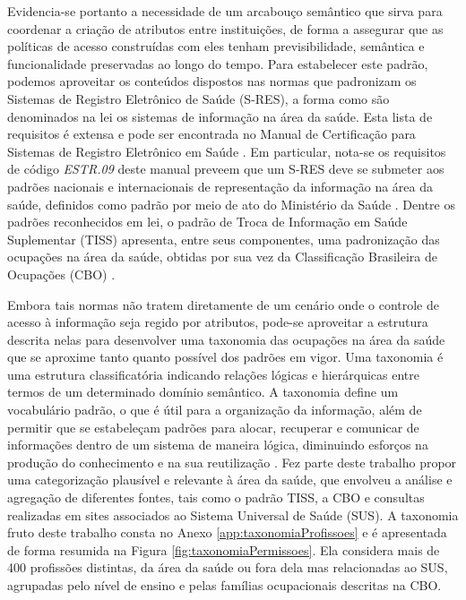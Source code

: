 \documentclass[a4paper,11pt]{article}
\begin{document}
Evidencia-se portanto a necessidade de um arcabouço semântico que sirva para coordenar a criação de atributos entre instituições, de forma a assegurar que as políticas de acesso construídas com eles tenham previsibilidade, semântica e funcionalidade preservadas ao longo do tempo.
Para estabelecer este padrão, podemos aproveitar os conteúdos dispostos nas normas que padronizam os Sistemas de Registro Eletrônico de Saúde (S-RES), a forma como são denominados na lei os sistemas de informação na área da saúde.
Esta lista de requisitos é extensa e pode ser encontrada no Manual de Certificação para Sistemas de Registro Eletrônico em Saúde \cite{SBIS2016}.
Em particular, nota-se os requisitos de código \emph{ESTR.09} deste manual preveem que um S-RES deve se submeter aos padrões nacionais e internacionais de representação da informação na área da saúde, definidos como padrão por meio de ato do Ministério da Saúde \cite{MinisteriodaSaude2011}.
Dentre os padrões reconhecidos em lei, o padrão de Troca de Informação em Saúde Suplementar (TISS) \cite{ANS2020} apresenta, entre seus componentes, uma padronização das ocupações na área da saúde, obtidas por sua vez da Classificação Brasileira de Ocupações (CBO) \cite{MTE2010}.


Embora tais normas não tratem diretamente de um cenário onde o controle de acesso à informação seja regido por atributos, pode-se aproveitar a estrutura descrita nelas para desenvolver uma taxonomia das ocupações na área da saúde que se aproxime tanto quanto possível dos padrões em vigor.
Uma taxonomia é uma estrutura classificatória indicando relações lógicas e hierárquicas entre termos de um determinado domínio semântico.
A taxonomia define um vocabulário padrão, o que é útil para a organização da informação, além de permitir que se estabeleçam padrões para alocar, recuperar e comunicar de informações dentro de um sistema de maneira lógica, diminuindo esforços na produção do conhecimento e na sua reutilização \cite{Campos2007}. %
Fez parte deste trabalho propor uma categorização plausível e relevante à área da saúde, que envolveu a análise e agregação de diferentes fontes, tais como o padrão TISS, a CBO e consultas realizadas em sites associados ao Sistema Universal de Saúde (SUS).
A taxonomia fruto deste trabalho consta no Anexo \ref{app:taxonomiaProfissoes} e é apresentada de forma resumida na Figura \ref{fig:taxonomiaPermissoes}. %
Ela considera mais de 400 profissões distintas, da área da saúde ou fora dela mas relacionadas ao SUS, agrupadas pelo nível de ensino e pelas famílias ocupacionais descritas na CBO.
\end{document}
